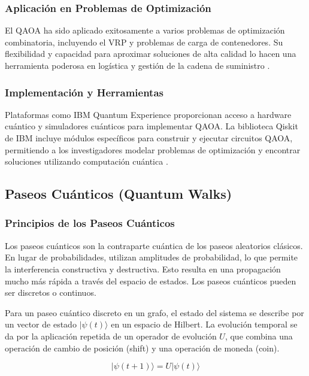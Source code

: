 \documentclass[11pt,a4paper,spanish]{book}
\begin{document}
\subsubsection{Aplicación en Problemas de Optimización}

El QAOA ha sido aplicado exitosamente a varios problemas de optimización combinatoria, incluyendo el VRP y problemas de carga de contenedores. Su flexibilidad y capacidad para aproximar soluciones de alta calidad lo hacen una herramienta poderosa en logística y gestión de la cadena de suministro \cite{phillipson2024}.

\subsubsection{Implementación y Herramientas}

Plataformas como IBM Quantum Experience proporcionan acceso a hardware cuántico y simuladores cuánticos para implementar QAOA. La biblioteca Qiskit de IBM incluye módulos específicos para construir y ejecutar circuitos QAOA, permitiendo a los investigadores modelar problemas de optimización y encontrar soluciones utilizando computación cuántica \cite{gibneyQuantumTech}.

\subsection{Paseos Cuánticos (Quantum Walks)}

\subsubsection{Principios de los Paseos Cuánticos}

Los paseos cuánticos son la contraparte cuántica de los paseos aleatorios clásicos. En lugar de probabilidades, utilizan amplitudes de probabilidad, lo que permite la interferencia constructiva y destructiva. Esto resulta en una propagación mucho más rápida a través del espacio de estados. Los paseos cuánticos pueden ser discretos o continuos.

Para un paseo cuántico discreto en un grafo, el estado del sistema se describe por un vector de estado \(|\psi(t)\rangle\) en un espacio de Hilbert. La evolución temporal se da por la aplicación repetida de un operador de evolución \(U\), que combina una operación de cambio de posición (shift) y una operación de moneda (coin).

\[
|\psi(t+1)\rangle = U|\psi(t)\rangle
\]
\end{document}
